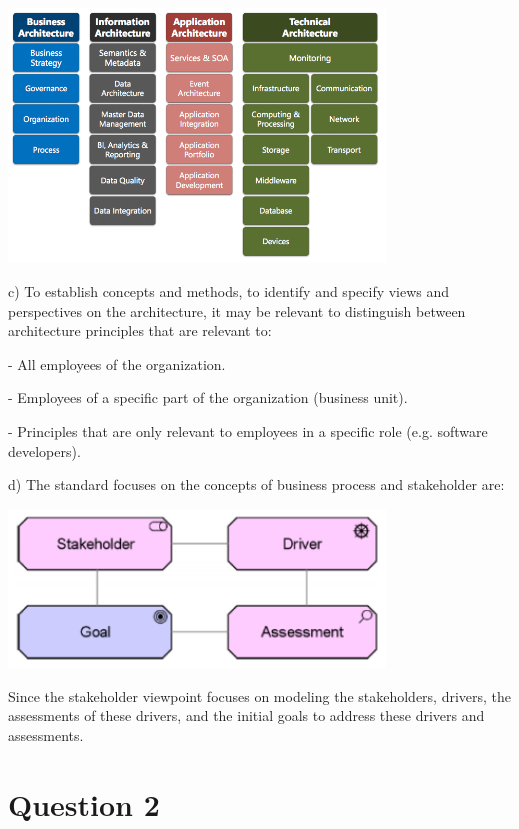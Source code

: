 \documentclass[a4paper,12pt]{texDoc}
\begin{document}
\begin{center}
\includegraphics[width=0.75\textwidth]{concepts.png}
\end{center}

c) To establish concepts and methods, to identify and specify views and perspectives on the architecture, it may be relevant to distinguish between architecture principles that are relevant to:

- All employees of the organization.

- Employees of a specific part of the organization (business unit).

- Principles that are only relevant to employees in a specific role (e.g. software developers).

d) The standard focuses on the concepts of business process and stakeholder are:

\begin{center}
\includegraphics[width=0.75\textwidth]{stakeholders.png}
\end{center}

Since the stakeholder viewpoint focuses on modeling the stakeholders, drivers, the assessments of these drivers, and the initial goals to address these drivers and assessments.

\section*{Question 2}
\end{document}
